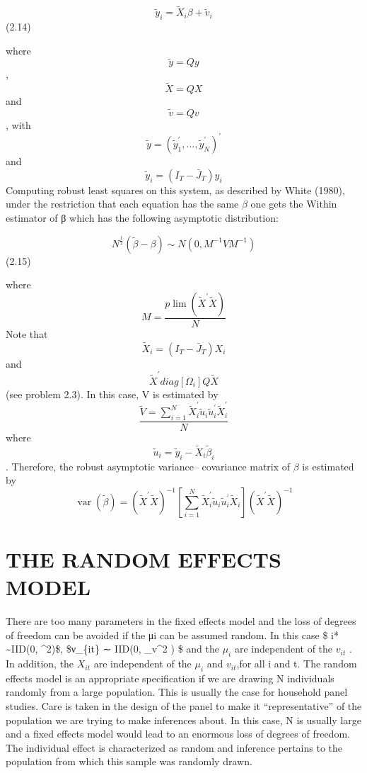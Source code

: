 \documentclass[
]{book}
\begin{document}
\[  \widetilde {y}_i=\widetilde{X}_{i} \beta + \widetilde{v}_{i}  \] (2.14)

where \[\widetilde{y}=Qy \] , \[\widetilde{X}=QX \] and \[\widetilde{v}=Qv \] , with \[\widetilde{y}=(\widetilde{y}_1^{\prime}, ...,\widetilde{y}_N^{\prime} )^{\prime} \] and \[\widetilde{y}_i=(I_T-\bar{J}_T) y_i \] Computing robust least squares on this system, as described by White (1980), under the restriction that each equation has the same \(\beta\) one gets the Within estimator of β which has the following asymptotic distribution:

\[N^{\frac{1}{2} }  (\widetilde{\beta}- \beta ) \sim N(0,M^{-1}VM^{-1} ) \] (2.15)

where \[M=\frac{ p\lim(\widetilde{X}^{\prime} \widetilde{X})} {N} \] Note that \[\widetilde{X}_i=(I_T - \bar{J}_T) X_i  \] and \[\widetilde{X}^{\prime} diag[\Omega_i] Q \widetilde{X} \] (see problem 2.3). In this case, V is estimated by \[ \frac{  \widetilde{V}=\sum_{i=1}^{N} \widetilde{X}_i^{\prime}\widetilde{u}_i \widetilde{u}_i^{\prime}\widetilde{X}_i^{\prime} } {N}  \] where \[\widetilde{u}_i=\widetilde{y}_i- \widetilde{X}_i \widetilde{\beta}_i\] . Therefore, the robust asymptotic variance-- covariance matrix of \(\beta\) is estimated by \[
\operatorname{var}(\widetilde{\beta})=\left(\widetilde{X}^{\prime} \tilde{X}\right)^{-1}\left[\sum_{i=1}^{N} \widetilde{X}_{i}^{\prime} \tilde{u}_{i} \tilde{u}_{i}^{\prime} \widetilde{X}_{i}\right]\left(\widetilde{X}^{\prime} \tilde{X}\right)^{-1}
\]

\hypertarget{the-random-effects-model}{%
\section{THE RANDOM EFFECTS MODEL}\label{the-random-effects-model}}

There are too many parameters in the fixed effects model and the loss of degrees of freedom can be avoided if the μi can be assumed random. In this case \$ \mu*i* \sim IID(0, \sigma\mu\^{}2)\$, \$ν\_\{it\} ∼ IID(0, \sigma\_v\^{}2 ) \$ and the \(\mu_i\) are independent of the \(v_{it}\) . In addition, the \(X_{it}\) are independent of the \(\mu_i\) and \(v_{it}\),for all i and t. The random effects model is an appropriate specification if we are drawing N individuals randomly from a large population. This is usually the case for household panel studies. Care is taken in the design of the panel to make it ``representative'' of the population we are trying to make inferences about. In this case, N is usually large and a fixed effects model would lead to an enormous loss of degrees of freedom. The individual effect is characterized as random and inference pertains to the population from which this sample was randomly drawn.
\end{document}
